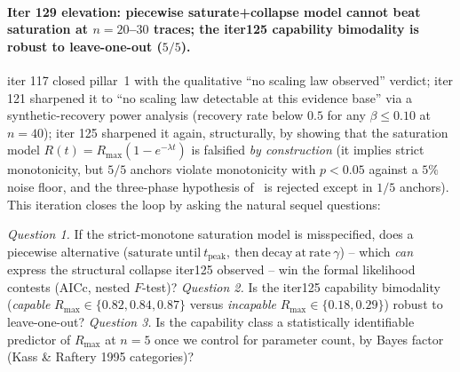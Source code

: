 %
%
\paragraph{Iter 129 elevation: piecewise saturate+collapse model cannot beat saturation at $n = 20$--$30$ traces; the iter125 capability bimodality is robust to leave-one-out ($5/5$).}
\label{par:scaling-iter129}

iter 117 closed pillar~1 with the qualitative ``no scaling law
observed'' verdict; iter 121 sharpened it to ``no scaling law
detectable at this evidence base'' via a synthetic-recovery power
analysis (recovery rate below $0.5$ for any $\beta \le 0.10$ at
$n = 40$); iter 125 sharpened it again, structurally, by showing
that the saturation model
$R(t) = R_{\max}(1 - e^{-\lambda t})$ is falsified \emph{by
construction} (it implies strict monotonicity, but $5/5$ anchors
violate monotonicity with $p < 0.05$ against a $5\%$ noise floor,
and the three-phase hypothesis of~\citet{arXiv2507.18014} is
rejected except in $1/5$ anchors).  This iteration closes the loop
by asking the natural sequel questions:

\emph{Question 1.}  If the strict-monotone saturation model is
misspecified, does a piecewise alternative
($\mathrm{saturate\ until\ } t_\mathrm{peak},
\mathrm{\ then\ decay\ at\ rate\ } \gamma$) -- which \emph{can}
express the structural collapse iter125 observed -- win the formal
likelihood contests (AICc, nested $F$-test)?
\emph{Question 2.}  Is the iter125 capability bimodality
(\emph{capable} $R_{\max}\!\in\!\{0.82, 0.84, 0.87\}$ versus
\emph{incapable} $R_{\max}\!\in\!\{0.18, 0.29\}$) robust to
leave-one-out?
\emph{Question 3.}  Is the capability class a statistically
identifiable predictor of $R_{\max}$ at $n=5$ once we control for
parameter count, by Bayes factor (Kass \& Raftery 1995
categories)?

